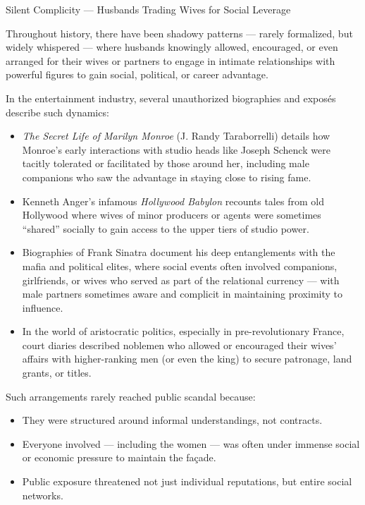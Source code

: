 \begin{HistoricalSidebar}{Silent Complicity --- Husbands Trading Wives for Social Leverage}

    Throughout history, there have been shadowy patterns — rarely formalized, but widely whispered — where husbands knowingly allowed, encouraged, or even arranged for their wives or partners to engage in intimate relationships with powerful figures to gain social, political, or career advantage.
    
    \medskip
    
    In the entertainment industry, several unauthorized biographies and exposés describe such dynamics:

    \medskip

    \begin{itemize}
        \item \textit{The Secret Life of Marilyn Monroe} (J. Randy Taraborrelli) details how Monroe’s early interactions with studio heads like Joseph Schenck were tacitly tolerated or facilitated by those around her, including male companions who saw the advantage in staying close to rising fame.
        \item Kenneth Anger’s infamous \textit{Hollywood Babylon} recounts tales from old Hollywood where wives of minor producers or agents were sometimes “shared” socially to gain access to the upper tiers of studio power.
        \item Biographies of Frank Sinatra document his deep entanglements with the mafia and political elites, where social events often involved companions, girlfriends, or wives who served as part of the relational currency — with male partners sometimes aware and complicit in maintaining proximity to influence.
        \item In the world of aristocratic politics, especially in pre-revolutionary France, court diaries described noblemen who allowed or encouraged their wives’ affairs with higher-ranking men (or even the king) to secure patronage, land grants, or titles.
    \end{itemize}
    
    \medskip
    
    Such arrangements rarely reached public scandal because:

    \medskip

    \begin{itemize}
        \item They were structured around informal understandings, not contracts.
        \item Everyone involved — including the women — was often under immense social or economic pressure to maintain the façade.
        \item Public exposure threatened not just individual reputations, but entire social networks.
    \end{itemize}
    

\end{HistoricalSidebar}
